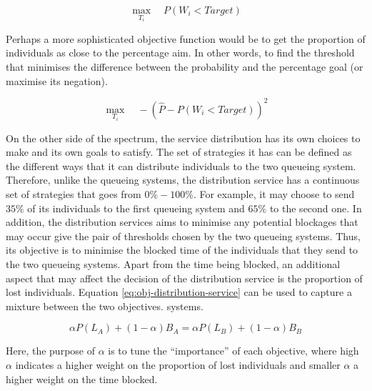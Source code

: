 \begin{equation}
    \max_{T_i} \quad P(W_i < \textit{Target})
\end{equation}

Perhaps a more sophisticated objective function would be to get the proportion 
of individuals as close to the percentage aim. 
In other words, to find the threshold that minimises the difference between the 
probability and the percentage goal (or maximise its negation).

\begin{equation}
    \max_{T_i} \quad -\left( \hat{P} - P(W_i < \textit{Target}) \right)^2
\end{equation}


On the other side of the spectrum, the service distribution has its own choices 
to make and its own goals to satisfy.
The set of strategies it has can be defined as the different ways that it can 
distribute individuals to the two queueing system.
Therefore, unlike the queueing systems, the distribution service has a 
continuous set of strategies that goes from \( 0\% - 100\% \). 
For example, it may choose to send \(35\%\) of its individuals to the first 
queueing system and \(65\%\) to the second one.
In addition, the distribution services aims to minimise any potential blockages
that may occur give the pair of thresholds chosen by the two queueing systems.
Thus, its objective is to minimise the blocked time of the individuals 
that they send to the two queueing systems.
Apart from the time being blocked, an additional aspect that may affect the 
decision of the distribution service is the proportion of lost individuals.
Equation \ref{eq:obj-distribution-service} can be used to capture a mixture 
between the two objectives.
systems.

\begin{equation}\label{eq:obj-distribution-service}
    \alpha P(L_A) + (1 - \alpha) B_A = 
    \alpha P(L_B) + (1 - \alpha) B_B
\end{equation}

Here, the purpose of \(\alpha\) is to tune the ``importance'' of each objective,
where high \(\alpha\) indicates a higher weight on the proportion of lost 
individuals and smaller \(\alpha\) a higher weight on the time blocked. 



